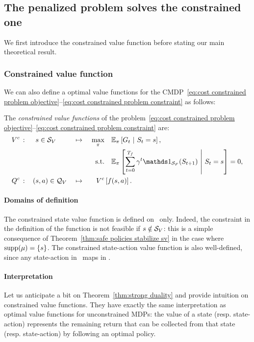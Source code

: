 \subsection{The penalized problem solves the constrained one}
We first introduce the constrained value function before stating our main theoretical result.

\subsubsection{Constrained value function}
We can also define a optimal value functions for the CMDP~\eqref{eq:cost constrained problem objective}--\eqref{eq:cost constrained problem constraint} as follows:
\begin{definition}
	The\emph{ constrained value functions} of the problem~\eqref{eq:cost constrained problem objective}--\eqref{eq:cost constrained problem constraint} are:
	\begin{alignat}{7}
	V^c\,&:&\, &s\in\SV& &\mapsto&~\max_\pi & \quad\expected_\pi\left[G_t~\middle|~S_t = s\right], \label{eq:constrained state value}\\
	& & & & & &\text{s.t.} & \quad \expected_\pi\left[\sum_{t=0}^\Tf\gamma^t\indicator_\SF(S_{t+1})~\middle|~S_t = s\right] = 0, \label{eq:constrained state value constraint}\\
	Q^c\,&:&\,(&s, a)\in\QV& &\mapsto& V^c&\left[f(s, a)\right]. \label{eq:constrained stateaction value}
	\end{alignat}
\end{definition}
\paragraph{Domains of definition} The constrained state value function is defined on \SV~only. Indeed, the constraint in the definition of the function is not feasible if $s\notin{\ensuremath{\mathcal{S}}_{V}}$: this is a simple consequence of Theorem~\ref{thm:safe policies stabilize sv} in the case where $\operatorname{supp}(\mu) = \{s\}$. The constrained state-action value function is also well-defined, since any state-action in \QV~maps in \SV.
\paragraph{Interpretation} Let us anticipate a bit on Theorem~\ref{thm:strong duality} and provide intuition on constrained value functions. They have exactly the same interpretation as optimal value functions for unconstrained MDPs: the value of a state (resp. state-action) represents the remaining return that can be collected from that state (resp. state-action) by following an optimal policy. 

